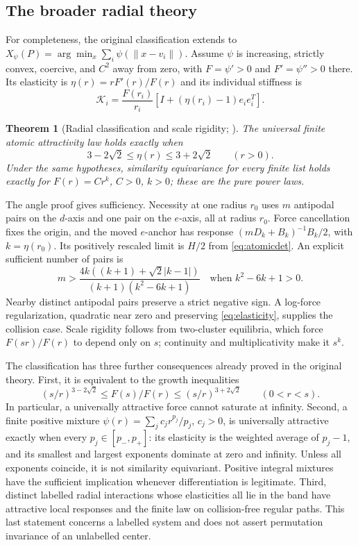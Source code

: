 \documentclass[11pt]{article}
\newtheorem{theorem}{Theorem}[section]
\theoremstyle{definition}
\newcommand{\pn}{p_{-}}
\newcommand{\pp}{p_{+}}
\begin{document}
\subsection{The broader radial theory}
For completeness, the original classification extends to
$X_\psi(P)=\arg\min_x\sum_i\psi(\|x-v_i\|)$.
Assume $\psi$ is increasing, strictly convex, coercive, and $C^2$ away
from zero, with $F=\psi'>0$ and $F'=\psi''>0$ there. Its elasticity is
$\eta(r)=rF'(r)/F(r)$ and its individual stiffness is
\[
 \mathcal K_i=\frac{F(r_i)}{r_i}
       [I+(\eta(r_i)-1)e_ie_i^T].
\]
\begin{theorem}[Radial classification and scale rigidity; \cite{PaperIII}]
The universal finite atomic attractivity law holds exactly when
\begin{equation}\label{eq:elasticity}
 3-2\sqrt2\le\eta(r)\le3+2\sqrt2\qquad(r>0).
\end{equation}
Under the same hypotheses, similarity equivariance for every finite list
holds exactly for $F(r)=Cr^k$, $C>0$, $k>0$; these are the pure power laws.
\end{theorem}
The angle proof gives sufficiency. Necessity at one radius $r_0$ uses
$m$ antipodal pairs on the $d$-axis and one pair on the $e$-axis, all at
radius $r_0$. Force cancellation fixes the origin, and the moved $e$-anchor
has response $(mD_k+B_k)^{-1}B_k/2$, with $k=\eta(r_0)$.
Its positively rescaled limit is $H/2$ from \eqref{eq:atomicdet}.
An explicit sufficient number of pairs is
\[
 m>\frac{4k((k+1)+\sqrt2|k-1|)}{(k+1)(k^2-6k+1)}
 \quad\text{when }k^2-6k+1>0.
\]
Nearby distinct antipodal pairs preserve a strict negative sign. A
log-force regularization, quadratic near zero and preserving
\eqref{eq:elasticity}, supplies the collision case. Scale rigidity follows
from two-cluster equilibria, which force $F(sr)/F(r)$ to depend only on $s$;
continuity and multiplicativity make it $s^k$.

The classification has three further consequences already proved in the
original theory. First, it is equivalent to the growth inequalities
\[
 (s/r)^{3-2\sqrt2}\le F(s)/F(r)\le(s/r)^{3+2\sqrt2}\qquad(0<r<s).
\]
In particular, a universally attractive force cannot saturate at infinity.
Second, a finite positive mixture
$\psi(r)=\sum_j c_j r^{p_j}/p_j$, $c_j>0$, is universally attractive
exactly when every $p_j\in[\pn,\pp]$: its elasticity is the weighted average
of $p_j-1$, and its smallest and largest exponents dominate at zero and
infinity. Unless all exponents coincide, it is not similarity equivariant.
Positive integral mixtures have the sufficient implication whenever
differentiation is legitimate. Third, distinct labelled radial interactions
whose elasticities all lie in the band have attractive local responses and
the finite law on collision-free regular paths. This last statement concerns
a labelled system and does not assert permutation invariance of an unlabelled
center.
\end{document}
